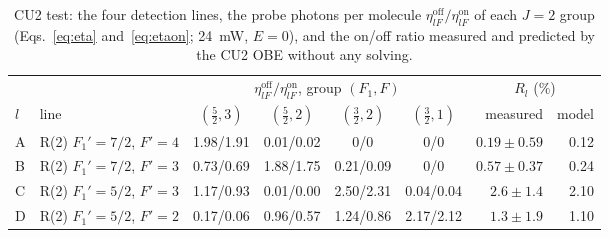 \documentclass[11pt,a4paper,oneside]{report}
\begin{document}
\begin{table}[htbp]
  \centering
  \caption[CU2 test: detection lines and probe yields]{CU2 test: the four detection lines, the probe
  photons per molecule $\eta^{\mathrm{off}}_{lF}/\eta^{\mathrm{on}}_{lF}$ of each $J=2$ group
  (Eqs.~\eqref{eq:eta} and~\eqref{eq:etaon}; \SI{24}{mW}, $E=0$), and the on/off ratio measured and predicted by the CU2 OBE
  without any solving.}
  \label{tab:cu2_test_lines}
  \small
  \setlength{\tabcolsep}{3.5pt}
  \begin{tabular}{llccccrr}
    \toprule
    & & \multicolumn{4}{c}{$\eta^{\mathrm{off}}_{lF}/\eta^{\mathrm{on}}_{lF}$, group $(F_1,F)$} & \multicolumn{2}{c}{$R_l$ (\%)} \\
    $l$ & line & $(\tfrac52,3)$ & $(\tfrac52,2)$ & $(\tfrac32,2)$ & $(\tfrac32,1)$ & measured & model \\
    \midrule
    A & R(2) $F_1'=7/2$, $F'=4$ & 1.98/1.91 & 0.01/0.02 & 0/0 & 0/0 & $0.19\pm0.59$ & 0.12 \\
    B & R(2) $F_1'=7/2$, $F'=3$ & 0.73/0.69 & 1.88/1.75 & 0.21/0.09 & 0/0 & $0.57\pm0.37$ & 0.24 \\
    C & R(2) $F_1'=5/2$, $F'=3$ & 1.17/0.93 & 0.01/0.00 & 2.50/2.31 & 0.04/0.04 & $2.6\pm1.4$ & 2.10 \\
    D & R(2) $F_1'=5/2$, $F'=2$ & 0.17/0.06 & 0.96/0.57 & 1.24/0.86 & 2.17/2.12 & $1.3\pm1.9$ & 1.10 \\
    \bottomrule
  \end{tabular}
\end{table}
\end{document}
